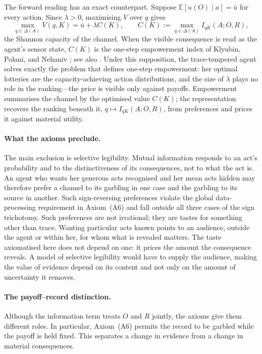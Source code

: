 \documentclass[11pt,a4paper]{article}
\theoremstyle{definition}
\newcommand{\E}{\mathbb E}
\newcommand{\1}{\mathbf 1}
\begin{document}
The forward reading has an exact counterpart.  Suppose $\E[u(O)\mid a]=\bar u$ for every action.  Since
$\lambda>0$, maximising $V$ over $q$ gives
\[
 \max_{q\in\Delta(A)}V(q,K)=\bar u+\lambda C(K),
 \qquad
 C(K):=\max_{q\in\Delta(A)}I_{qK}(A;O,R),
\]
the Shannon capacity of the channel.  When the visible consequence is read as the agent's sensor state, $C(K)$
is the one-step empowerment index of Klyubin, Polani, and Nehaniv \cite{KlyubinPolaniNehaniv2005}; see also
\cite{SalgeGlackinPolani2014}.  Under this supposition, the trace-tempered agent solves exactly the problem
that defines one-step empowerment: her optimal lotteries are the capacity-achieving action distributions, and
the size of $\lambda$ plays no role in the ranking---the price is visible only against payoffs.  Empowerment
summarises the channel by the optimised value $C(K)$; the representation recovers the ranking beneath it,
$q\mapsto I_{qK}(A;O,R)$, from preferences and prices it against material utility.

\paragraph{What the axioms preclude.}
The main exclusion is selective legibility.  Mutual information responds to an act's
probability and to the distinctiveness of its consequences, not to what the act is.  An agent who wants her generous
acts recognised and her mean acts hidden may therefore prefer a channel to its garbling in one case and the garbling to its source
in another.  Such sign-reversing preferences violate the global data-processing requirement in Axiom~\textup{(A6)} and fall
outside all three cases of the sign trichotomy.  Such preferences are not irrational; they are tastes for
something other than trace.  Wanting particular acts known points to an audience, outside the agent or within
her, for whom what is revealed matters.  The taste axiomatised here does not depend on one: it prices the amount
the consequence reveals.  A model of selective legibility would have to supply the audience, making
the value of evidence depend on its content and not only on the amount of uncertainty it removes.

\paragraph{The payoff--record distinction.}



Although the information term treats $O$ and $R$ jointly, the axioms give them different roles.  In particular, Axiom~\textup{(A6)} permits the record to be garbled while the payoff is held fixed. This separates a change in evidence from a change in material
consequences.
\end{document}
